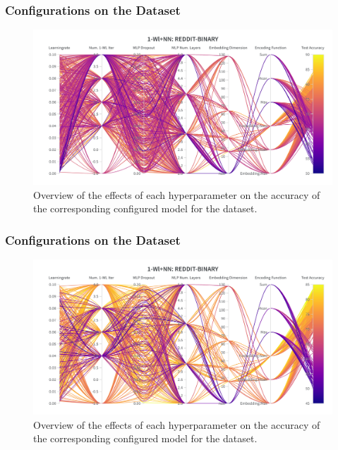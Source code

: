 \subsubsection{\wlnn Configurations on the \mutag Dataset}
\begin{figure}[H]
    \centering
    \includegraphics[width=\textwidth, trim={0 75 0 150}, clip]{Figures/hyperparameter_wlnn_mutag.png}
    \caption{Overview of the effects of each hyperparameter on the accuracy of the corresponding configured \wlnn model for the \mutag dataset.}
    \label{fig:wandb_wlnn_mutag}
\end{figure}

\subsubsection{\wlnn Configurations on the \nci Dataset}
\begin{figure}[H]
    \centering
    \includegraphics[width=\textwidth, trim={0 75 0 150}, clip]{Figures/hyperparameter_wlnn_nci1.png}
    \caption{Overview of the effects of each hyperparameter on the accuracy of the corresponding configured \wlnn model for the \nci dataset.}
    \label{fig:wandb_wlnn_nci}
\end{figure}
\clearpage

